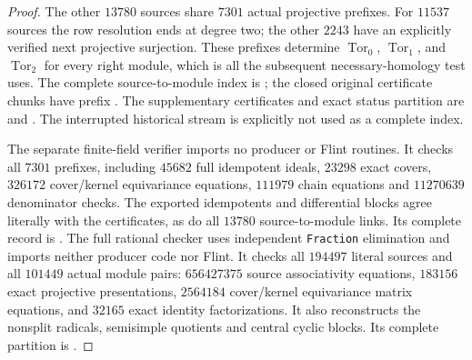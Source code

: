 \begin{proof}
The other $13780$ sources share $7301$ actual projective prefixes.
For $11537$ sources the row resolution ends at degree two;
the other $2243$ have an explicitly verified next projective
surjection.  These prefixes determine $\operatorname{Tor}_0$,
$\operatorname{Tor}_1$, and $\operatorname{Tor}_2$ for every right
module, which is all the subsequent necessary-homology test uses.
The complete source-to-module index is
;
the closed original certificate chunks have prefix
.
The supplementary certificates and exact status partition are
 and
.
The interrupted historical stream is explicitly not used as a
complete index.

The separate finite-field verifier
 imports no producer
or Flint routines.  It checks all $7301$ prefixes, including
$45682$ full idempotent ideals, $23298$ exact covers,
$326172$ cover/kernel equivariance equations, $111979$ chain
equations and $11270639$ denominator checks.  The exported
idempotents and differential blocks agree literally with the
certificates, as do all $13780$ source-to-module links.  Its
complete record is
.
The full rational checker
 uses independent
\texttt{Fraction} elimination and imports neither producer code
nor Flint.  It checks all $194497$ literal sources and all
$101449$ actual module pairs: $656427375$ source associativity
equations, $183156$ exact projective presentations,
$2564184$ cover/kernel equivariance matrix equations, and
$32165$ exact identity factorizations.  It also reconstructs the
nonsplit radicals, semisimple quotients and central cyclic blocks.
Its complete partition is
.
\end{proof}

